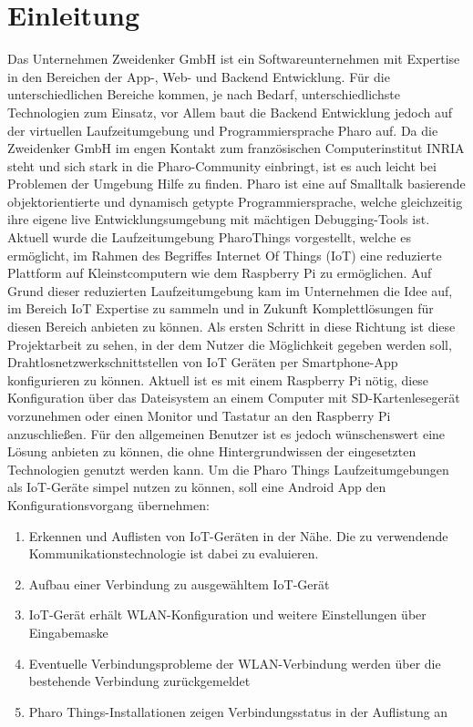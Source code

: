 \section{Einleitung}
	Das Unternehmen Zweidenker GmbH ist ein Softwareunternehmen mit Expertise in den Bereichen der App-, Web- und Backend Entwicklung.\cite{zweidenker}
	Für die unterschiedlichen Bereiche kommen, je nach Bedarf, unterschiedlichste Technologien zum Einsatz, vor Allem baut die Backend Entwicklung jedoch auf der virtuellen Laufzeitumgebung und Programmiersprache Pharo auf.
	Da die Zweidenker GmbH im engen Kontakt zum französischen Computerinstitut INRIA steht und sich stark in die Pharo-Community einbringt, ist es auch leicht bei Problemen der Umgebung Hilfe zu finden. 
	Pharo ist eine auf Smalltalk basierende objektorientierte und dynamisch getypte Programmiersprache,
    welche gleichzeitig ihre eigene live Entwicklungsumgebung mit mächtigen Debugging-Tools ist.\cite{pharo}
    Aktuell wurde die Laufzeitumgebung PharoThings \cite{pharoThings} vorgestellt, welche es ermöglicht, im Rahmen des Begriffes Internet Of Things (IoT) eine reduzierte Plattform auf Kleinstcomputern wie dem Raspberry Pi zu ermöglichen.
    Auf Grund dieser reduzierten Laufzeitumgebung kam im Unternehmen die Idee auf, im Bereich IoT Expertise zu sammeln und in Zukunft Komplettlösungen für diesen Bereich anbieten zu können. Als ersten Schritt in diese Richtung ist diese Projektarbeit zu sehen, in der dem Nutzer die Möglichkeit gegeben werden soll, Drahtlosnetzwerkschnittstellen von IoT Geräten per Smartphone-App konfigurieren zu können. Aktuell ist es mit einem Raspberry Pi nötig, diese Konfiguration über das Dateisystem an einem Computer mit SD-Kartenlesegerät vorzunehmen oder einen Monitor und Tastatur an den Raspberry Pi anzuschließen. Für den allgemeinen Benutzer ist es jedoch wünschenswert eine Lösung anbieten zu können, die ohne Hintergrundwissen der eingesetzten Technologien genutzt werden kann.
    Um die Pharo Things Laufzeitumgebungen als IoT-Geräte simpel nutzen zu können, soll eine Android App den Konfigurationsvorgang übernehmen:
    \begin{enumerate}
        \item Erkennen und Auflisten von IoT-Geräten in der Nähe. Die zu verwendende Kommunikationstechnologie ist dabei zu evaluieren.
        \item Aufbau einer Verbindung zu ausgewähltem IoT-Gerät
        \item IoT-Gerät erhält WLAN-Konfiguration und weitere Einstellungen über Eingabemaske
        \item Eventuelle Verbindungsprobleme der WLAN-Verbindung werden über die bestehende Verbindung zurückgemeldet
        \item Pharo Things-Installationen zeigen Verbindungsstatus in der Auflistung an
    \end{enumerate}
